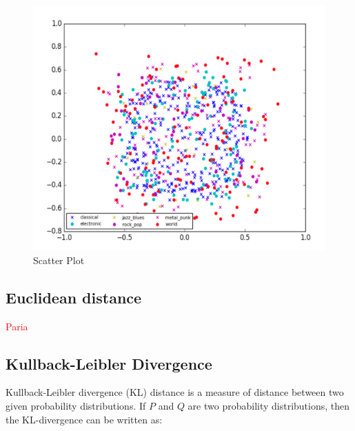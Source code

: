 \documentclass[12pt]{article}
\begin{document}
\begin{figure}[H]\label{emd_scatter}
\center
\includegraphics[scale=0.8]{emd_scatter.png}
\caption{Scatter Plot}
\end{figure}

\subsection{Euclidean distance}\textcolor{red}{Paria}
\subsection{Kullback-Leibler Divergence}
Kullback-Leibler divergence (KL) distance is a measure of distance between two given probability distributions. If $P$ and $Q$ are two probability distributions, then the KL-divergence can be written as:
\end{document}
